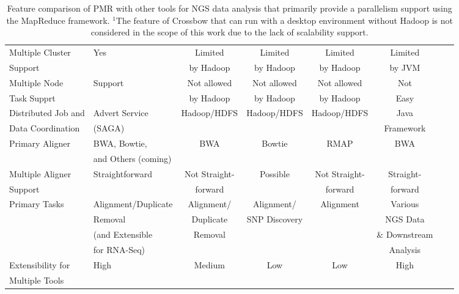 \documentclass{sig-alternate}
\begin{document}
{\begin{center}
\begin{table}[ht]
{\begin{tabular}{|l|l|c|c|c|c|c|c|}
Multiple  Cluster & Yes  & Limited   & Limited  & Limited  & Limited \\
Support &  & by Hadoop &  by Hadoop & by Hadoop  & by JVM   \\ \hline

Multiple Node & Support & Not allowed  & Not allowed  & Not allowed & Not  \\
Task Supprt &  & by Hadoop & by Hadoop & by Hadoop & Easy  \\ \hline
Distributed Job and  & Advert Service  & Hadoop/HDFS & Hadoop/HDFS & Hadoop/HDFS & Java \\ 
Data Coordination &(SAGA) &  & & & Framework\\ \hline


Primary Aligner &  BWA, Bowtie,  &  BWA & Bowtie & RMAP &  BWA \\
& and Others (coming) &  &  &  &  \\ \hline
Multiple Aligner  & Straightforward & Not Straight- & Possible & Not Straight-  & Straight-  \\ 
Support &  & forward &   & forward  & forward \\\hline
Primary Tasks & Alignment/Duplicate  & Alignment/ & Alignment/ & Alignment &Various\\
  &  Removal & Duplicate & SNP Discovery & & NGS Data  \\  
           & (and Extensible &  Removal & &  & \& Downstream  \\
           & for RNA-Seq) & & &  & Analysis \\ \hline  
Extensibility for   &  High  & Medium &  Low & Low & High      \\
Multiple Tools  &      &  &  &  &   \\ \hline

\hline
\end{tabular}}
\hfill{}
\caption{Feature comparison of PMR with other tools for NGS data analysis that primarily provide a parallelism support using the MapReduce framework.  $^{1}${The feature of Crossbow that can run with a desktop environment without Hadoop is not considered in the scope of this work due to the lack of scalability support.} }
 \label{table:mr-comparison}
\end{table}
\end{center}

}
\end{document}
